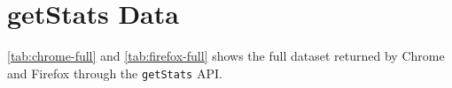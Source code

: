\chapter{getStats Data}\label{chp:getstats-data}

\autoref{tab:chrome-full} and \autoref{tab:firefox-full} shows the full dataset returned by Chrome and Firefox through the \texttt{getStats} API.


